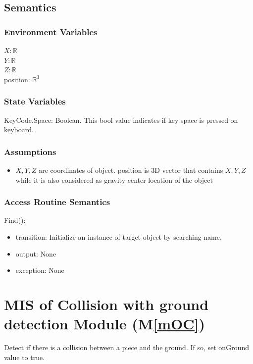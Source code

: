 \documentclass[12pt, titlepage]{article}
\newcommand{\mref}[1]{M\ref{#1}}
\begin{document}
\subsection{Semantics}

\subsubsection{Environment Variables}
$X: \mathbb{R}$\\
$Y: \mathbb{R}$\\
$Z: \mathbb{R}$\\
position: $\mathbb{R}^{3}$
\subsubsection{State Variables}

KeyCode.Space: Boolean.
This bool value indicates if key space is pressed on keyboard.

\subsubsection{Assumptions}

\noindent
\begin{itemize}
	\item $X,Y,Z$ are coordinates of object. position is 3D vector that contains $X,Y,Z$ while it is also considered as gravity center location of the object
\end{itemize}

\subsubsection{Access Routine Semantics}

\noindent Find():
\begin{itemize}
	\item transition: Initialize an instance of target object by searching name.
	\item output: None
	\item exception: None
\end{itemize}


\section{MIS of Collision with ground detection Module (\mref{mOC})}

Detect if there is a collision between a piece and the ground. If so, set onGround
value to true.
\end{document}
